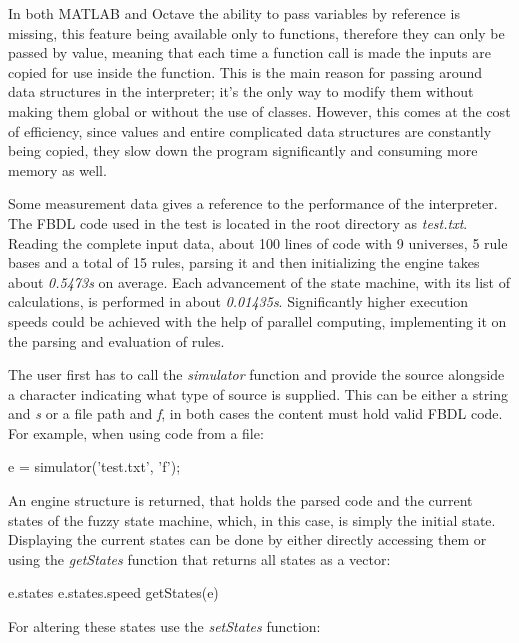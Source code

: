 In both MATLAB and Octave the ability to pass variables by reference is missing, this feature being available only to functions, therefore they can only be passed by value, meaning that each time a function call is made the inputs are copied for use inside the function. This is the main reason for passing around data structures in the interpreter; it's the only way to modify them without making them global or without the use of classes. However, this comes at the cost of efficiency, since values and entire complicated data structures are constantly being copied, they slow down the program significantly and consuming more memory as well.

Some measurement data gives a reference to the performance of the interpreter. The FBDL code used in the test is located in the root directory as \textit{test.txt}. Reading the complete input data, about 100 lines of code with 9 universes, 5 rule bases and a total of 15 rules, parsing it and then initializing the engine takes about \textit{0.5473s} on average. Each advancement of the state machine, with its list of calculations, is performed in about \textit{0.01435s}. Significantly higher execution speeds could be achieved with the help of parallel computing, implementing it on the parsing and evaluation of rules.

The user first has to call the \textit{simulator} function and provide the source alongside a character indicating what type of source is supplied. This can be either a string and \textit{s} or a file path and \textit{f}, in both cases the content must hold valid FBDL code. For example, when using code from a file:

\begin{octave}
e = simulator('test.txt', 'f');
\end{octave}

An engine structure is returned, that holds the parsed code and the current states of the fuzzy state machine, which, in this case, is simply the initial state. Displaying the current states can be done by either  directly accessing them or using the \textit{getStates} function that returns all states as a vector:

\begin{octave}
e.states %
e.states.speed %
getStates(e) %
\end{octave}

For altering these states use the \textit{setStates} function:

